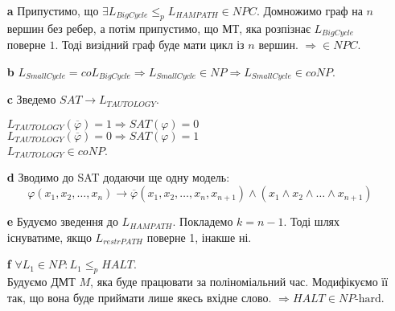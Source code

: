 \documentclass[12pt,letterpaper]{article}
\begin{document}
\begin{itemize}
    \item[\textbf{a}] Припустимо, що $\exists L_{BigCycle} \leq_p L_{HAMPATH} \in NPC$.
        Домножимо граф на $n$ вершин без ребер, а потім припустимо, що МТ, яка розпізнає
        $L_{BigCycle}$ поверне $1$. Тоді визідний граф буде мати цикл із $n$ вершин. $\Rightarrow \in NPC$.
    \item[\textbf{b}] $L_{SmallCycle} = co L_{BigCycle} \Rightarrow L_{SmallCycle} \in NP
        \Rightarrow L_{SmallCycle} \in coNP.$
    \item[\textbf{c}] Зведемо $SAT \rightarrow L_{TAUTOLOGY}$.

        $L_{TAUTOLOGY}(\overline{\varphi}) = 1\Rightarrow SAT(\varphi) = 0$ \\
        $L_{TAUTOLOGY}(\overline{\varphi}) = 0 \Rightarrow SAT(\varphi) = 1$\\
        $L_{TAUTOLOGY} \in coNP$.

    \item[\textbf{d}] Зводимо до SAT додаючи ще одну модель:
        \[ \varphi(x_1, x_2, \dots, x_n) \rightarrow \overline{\varphi}(x_1, x_2, \dots, x_n, x_{n+1}) \land (x_1 \land x_2 \land \dots \land x_{n+1}) \]
    \item[\textbf{e}] Будуємо зведення до $L_{HAMPATH}$. Покладемо $k = n - 1$. Тоді шлях існуватиме, якщо $L_{restrPATH}$ поверне 1, інакше ні.
    \item[\textbf{f}] $\forall L_1 \in NP : L_1 \leq_p HALT$.\\
        Будуємо ДМТ $M$, яка буде працювати за поліноміальний час. Модифікуємо її так, що вона буде приймати лише якесь вхідне слово. $\Rightarrow HALT \in NP\text{-hard}$.
\end{itemize}

\end{document}
